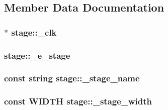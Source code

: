 \begin{DoxyCode}
{}
\end{DoxyCode}


\subsection{Member Data Documentation}
\hypertarget{classstage_a2a24f2b2bce75ee75d7d03962eb0cd23}{
\subsubsection[{\_\-clk}]{$\ast$ {\bf stage::\_\-clk}}}
\label{classstage_a2a24f2b2bce75ee75d7d03962eb0cd23}
\hypertarget{classstage_abb5082df431c2858839d3b54ef049ff9}{
\subsubsection[{\_\-e\_\-stage}]{ {\bf stage::\_\-e\_\-stage}}}
\label{classstage_abb5082df431c2858839d3b54ef049ff9}
\hypertarget{classstage_ad8500743b9a08a7d3b7a16e2c9ee7bca}{
\subsubsection[{\_\-stage\_\-name}]{\setlength{\rightskip}{0pt plus 5cm}const string {\bf stage::\_\-stage\_\-name}}}
\label{classstage_ad8500743b9a08a7d3b7a16e2c9ee7bca}
\hypertarget{classstage_a758da5ef14d0eca96290d4feaad91302}{
\subsubsection[{\_\-stage\_\-width}]{\setlength{\rightskip}{0pt plus 5cm}const {\bf WIDTH} {\bf stage::\_\-stage\_\-width}}}
